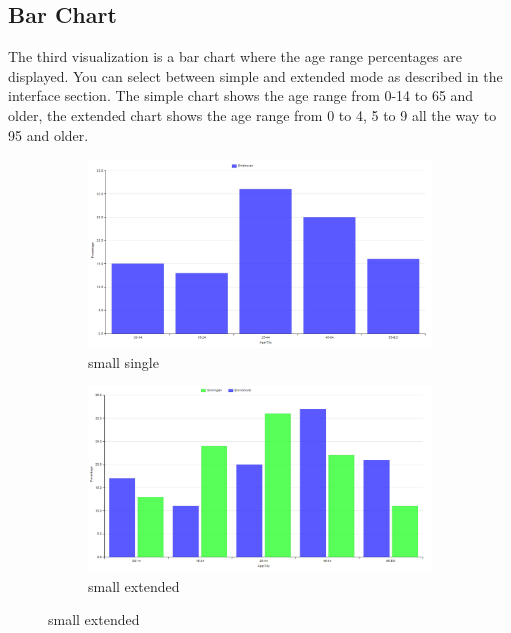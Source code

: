 \documentclass[a4paper,twoside,11pt]{article}
\begin{document}
\subsection{Bar Chart}
The third visualization is a bar chart where the age range percentages are displayed. You can select between simple and extended mode as described in the interface section. The simple chart shows the age range from 0-14 to 65 and older, the extended chart shows the age range from 0 to 4, 5 to 9 all the way to 95 and older. \newline
\newline
\begin{figure}
        \begin{subfigure}[b]{0.23\textwidth}
                \includegraphics[width=\textwidth]{Visualization/BarChartSimpleSingle.png}
                \caption{small single}
                \label{fig:smallSingle}
        \end{subfigure}
        \begin{subfigure}[b]{0.23\textwidth}
                \includegraphics[width=\textwidth]{Visualization/BarChartSimpleFull.png}
                \caption{small extended}

\end{subfigure}
\end{figure}
\end{document}
